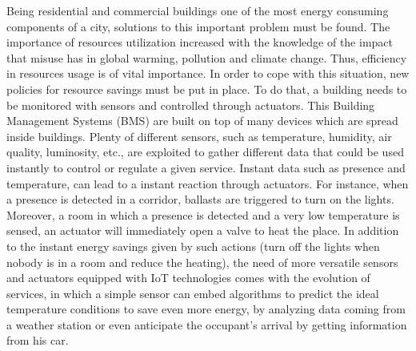 Being residential and commercial buildings one of the most energy consuming components\cite{perezLombard2008energy} of a city, solutions to this important problem must be found.
The importance of resources utilization increased with the knowledge of the impact that misuse has in global warming, pollution and climate change.
Thus, efficiency in resources usage is of vital importance.
In order to cope with this situation, new policies for resource savings must be put in place.
To do that, a building needs to be monitored with sensors and controlled through actuators.
This Building Management Systems (BMS) are built on top of many devices which are spread inside buildings.
Plenty of different sensors, such as temperature, humidity, air quality, luminosity, etc., are exploited to gather different data that could be used instantly to control or regulate a given service.
Instant data such as presence and temperature, can lead to a instant reaction through actuators.
For instance, when a presence is detected in a corridor, ballasts are triggered to turn on the lights.
Moreover, a room in which a presence is detected and a very low temperature is sensed, an actuator will immediately open a valve to heat the place.
In addition to the instant energy savings given by such actions (turn off the lights when nobody is in a room and reduce the heating), the need of more versatile sensors and actuators equipped with IoT technologies comes with the evolution of services, in which a simple sensor can embed algorithms to predict the ideal temperature conditions to save even more energy, by analyzing data coming from a weather station or even anticipate the occupant's arrival by getting information from his car.

